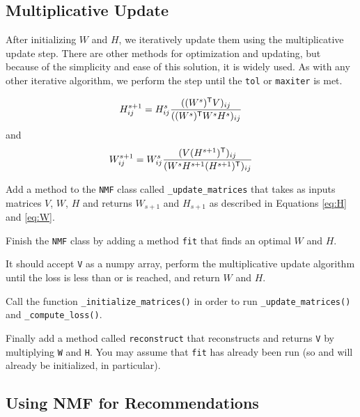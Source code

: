 \subsection*{Multiplicative Update}
After initializing $W$ and $H$, we iteratively update them using the multiplicative update step.
There are other methods for optimization and updating, but because of the simplicity and ease of this solution, it is widely used.
As with any other iterative algorithm, we perform the step until the \texttt{tol} or \texttt{maxiter} is met.

\begin{equation}
H^{s+1}_{ij} = H^{s}_{ij} \frac{((W^s)^{\mathsf T}  V)_{ij}}{((W^{s})^{\mathsf T} W^sH^s)_{ij}}
\label{eq:H}
\end{equation}
and
\begin{equation}
W^{s+1}_{ij} = W^{s}_{ij} \frac{(V(H^{s+1})^{\mathsf T} )_{ij}}{(W^{s}H^{s+1}(H^{s+1})^{\mathsf T} )_{ij}}
\label{eq:W}
\end{equation}



\begin{problem}
Add a method to the \texttt{NMF} class called \texttt{\_update\_matrices} that takes as inputs matrices $V$, $W$, $H$ and returns $W_{s+1}$ and $H_{s+1}$ as described in Equations \ref{eq:H} and \ref{eq:W}.
\end{problem}

\begin{problem}
Finish the \texttt{NMF} class by adding a method \texttt{fit} that finds an optimal $W$ and $H$.

It should accept \texttt{V} as a numpy array, perform the multiplicative update algorithm until the loss is less than  or  is reached, and return $W$ and $H$.

Call the function \texttt{\_initialize\_matrices()} in order to run \texttt{\_update\_matrices()} and \texttt{\_compute\_loss()}.

Finally add a method called \texttt{reconstruct} that reconstructs and returns \texttt{V} by multiplying \texttt{W} and \texttt{H}. You may assume that \texttt{fit} has already been run (so  and  will already be initialized, in particular).
\end{problem}

\subsection*{Using NMF for Recommendations}

